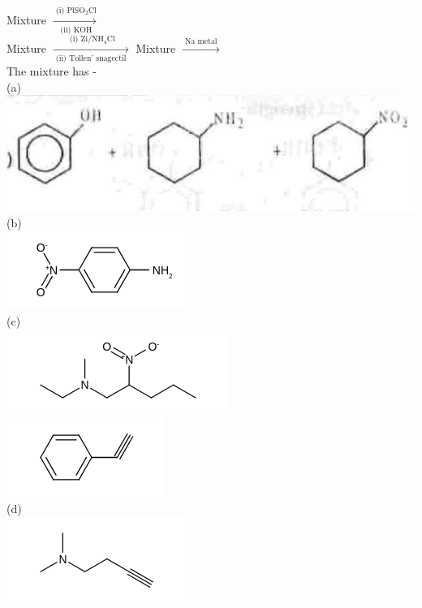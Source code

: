 \documentclass[10pt]{article}
\begin{document}
Mixture $\xrightarrow[\text { (ii) } \mathrm{KOH}]{\text { (i) } \mathrm{PlSO}_{2} \mathrm{Cl}}$\\
Mixture $\xrightarrow[\text { (ii) Tollen' snagectil }]{\text { (i) } \mathrm{Zi} / \mathrm{NH}_{4} \mathrm{Cl}}$ Mixture $\xrightarrow{\text { Na metal }}$\\
The mixture has -\\
(a)\\
\includegraphics[max width=\textwidth, center]{2025_01_28_8470952b98110cec3aabg-146(1)}\\
(b)\\
\includegraphics{smile-43427a0de67f7664cf728ab0f62fb81bb0ee406c}\\
(c)\\
\includegraphics{smile-8eb20489e1eee097b60f980a4e6905a3484ce4de}\\
\includegraphics{smile-4c4782cef1c461c12876b70989181c681377aa2a}\\
(d)\\
\includegraphics{smile-79353523364972c42e8e8af749ac38772f887fa0}\\
\end{document}

